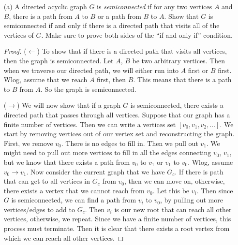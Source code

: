 \documentclass{article}
\begin{document}
\begin{itemize}
    \item [(a)] A directed acyclic graph $G$ is \textit{semiconnected} if for any two vertices $A$ and $B$, there is a path from $A$ to $B$ or a path from $B$ to $A$. Show that $G$ is semiconnected if and only if there is a directed path that visits all of the vertices of $G$. Make sure to prove both sides of the ``if and only if'' condition.
        \begin{proof}
            ($\leftarrow$) To show that if there is a directed path that visits all vertices, then the graph is semiconnected. Let $A$, $B$ be two arbitrary vertices. Then when we traverse our directed path, we will either run into $A$ first or $B$ first. Wlog, assume that we reach $A$ first, then $B$. This means that there is a path to $B$ from $A$. So the graph is semiconnected.

            ($\rightarrow$) We will now show that if a graph $G$ is semiconnected, there exists a directed path that passes through all vertices. Suppose that our graph has a finite number of vertices. Then we can write a vertices set $[v_{0}, v_{1}, v_{2}, \ldots]$. We start by removing vertices out of our vertex set and reconstructing the graph. First, we remove $v_{0}$. There is no edges to fill in. Then we pull out $v_{1}$. We might need to pull out more vertices to fill in all the edges connecting $v_{0}$, $v_{1}$, but we know that there exists a path from $v_{0}$ to $v_{1}$ or $v_{1}$ to $v_{0}$. Wlog, assume $v_{0} \rightarrow v_{1}$. Now consider the current graph that we have $G_{c}$. If there is path that can get to all vertices in $G_{c}$ from $v_{0}$, then we can move on, otherwise, there exists a vertex that we cannot reach from $v_{0}$. Let this be $v_{i}$. Then since $G$ is semiconnected, we can find a path from $v_{i}$ to $v_{0}$, by pulling out more vertices/edges to add to $G_{c}$. Then $v_{i}$ is our new root that can reach all other vertices, otherwise, we repeat. Since we have a finite number of vertices, this process must terminate. Then it is clear that there exists a root vertex from which we can reach all other vertices.
        \end{proof}


\end{itemize}
\end{document}
